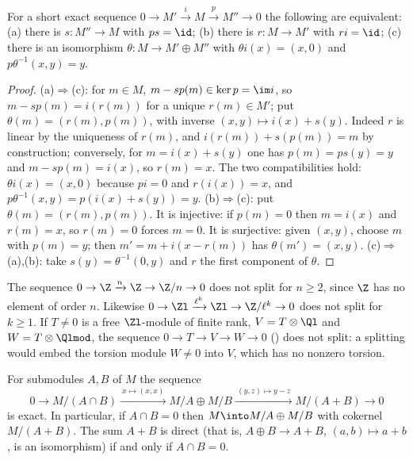 \begin{lemma}\label{lem:modules:splitting}
For a short exact sequence $0\to M'\xrightarrow{i}M\xrightarrow{p}M''\to0$ the following are equivalent:
(a) there is $s\colon M''\to M$ with $ps=\id$; (b) there is $r\colon M\to M'$ with $ri=\id$; (c) there is an isomorphism
$\theta\colon M\to M'\oplus M''$ with $\theta i(x)=(x,0)$ and $p\theta^{-1}(x,y)=y$.
\end{lemma}

\begin{proof}
(a)$\Rightarrow$(c): for $m\in M$, $m-sp(m)\in\ker p=\im i$, so $m-sp(m)=i(r(m))$ for a unique $r(m)\in M'$; put
$\theta(m)=(r(m),p(m))$, with inverse $(x,y)\mapsto i(x)+s(y)$. Indeed $r$ is linear by the uniqueness of $r(m)$, and
$i(r(m))+s(p(m))=m$ by construction; conversely, for $m=i(x)+s(y)$ one has $p(m)=ps(y)=y$ and $m-sp(m)=i(x)$, so $r(m)=x$. The two
compatibilities hold: $\theta i(x)=(x,0)$ because $p i=0$ and $r(i(x))=x$, and $p\theta^{-1}(x,y)=p(i(x)+s(y))=y$. (b)$\Rightarrow$(c): put $\theta(m)=(r(m),p(m))$. It is injective:
if $p(m)=0$ then $m=i(x)$ and $r(m)=x$, so $r(m)=0$ forces $m=0$. It is surjective: given $(x,y)$, choose $m$ with $p(m)=y$;
then $m'=m+i(x-r(m))$ has $\theta(m')=(x,y)$. (c)$\Rightarrow$(a),(b): take $s(y)=\theta^{-1}(0,y)$ and $r$ the first component of
$\theta$.
\end{proof}

\begin{example}\label{ex:modules:exact-examples}
The sequence $0\to\Z\xrightarrow{n}\Z\to\Z/n\to0$ does not split for $n\ge2$, since $\Z$ has no element of order $n$. Likewise
$0\to\Zl\xrightarrow{\ell^k}\Zl\to\Z/\ell^k\to0$ does not split for $k\ge1$. If $T\ne0$ is a free $\Zl$-module of finite rank,
$V=T\otimes\Ql$ and $W=T\otimes\Qlmod$, the sequence $0\to T\to V\to W\to0$ () does not split:
a splitting would embed the torsion module $W\ne0$ into $V$, which has no nonzero torsion.
\end{example}

\begin{proposition}\label{prop:modules:two-submodules}
For submodules $A,B$ of $M$ the sequence
\[
0\to M/(A\cap B)\xrightarrow{\ x\mapsto(x,x)\ }M/A\oplus M/B\xrightarrow{\ (y,z)\mapsto y-z\ }M/(A+B)\to0
\]
is exact. In particular, if $A\cap B=0$ then $M\into M/A\oplus M/B$ with cokernel $M/(A+B)$. The sum $A+B$ is direct (that is,
$A\oplus B\to A+B$, $(a,b)\mapsto a+b$, is an isomorphism) if and only if $A\cap B=0$.
\end{proposition}

